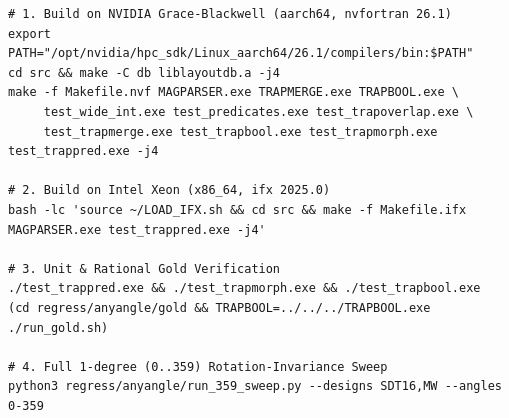 \begin{lstlisting}[style=ctrstyle,caption={Build and verification commands for NVIDIA HPC SDK (\texttt{nvfortran}) and Intel (\texttt{ifx}).},label={lst:build_ref}]
# 1. Build on NVIDIA Grace-Blackwell (aarch64, nvfortran 26.1)
export PATH="/opt/nvidia/hpc_sdk/Linux_aarch64/26.1/compilers/bin:$PATH"
cd src && make -C db liblayoutdb.a -j4
make -f Makefile.nvf MAGPARSER.exe TRAPMERGE.exe TRAPBOOL.exe \
     test_wide_int.exe test_predicates.exe test_trapoverlap.exe \
     test_trapmerge.exe test_trapbool.exe test_trapmorph.exe test_trappred.exe -j4

# 2. Build on Intel Xeon (x86_64, ifx 2025.0)
bash -lc 'source ~/LOAD_IFX.sh && cd src && make -f Makefile.ifx MAGPARSER.exe test_trappred.exe -j4'

# 3. Unit & Rational Gold Verification
./test_trappred.exe && ./test_trapmorph.exe && ./test_trapbool.exe
(cd regress/anyangle/gold && TRAPBOOL=../../../TRAPBOOL.exe ./run_gold.sh)

# 4. Full 1-degree (0..359) Rotation-Invariance Sweep
python3 regress/anyangle/run_359_sweep.py --designs SDT16,MW --angles 0-359
\end{lstlisting}
